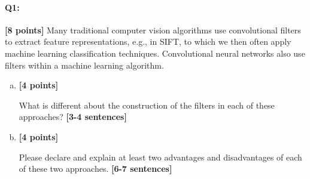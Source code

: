\pagebreak

\paragraph{Q1:} \textbf{[8 points]} Many traditional computer vision algorithms use convolutional filters to extract feature representations, e.g., in SIFT, to which we then often apply machine learning classification techniques. Convolutional neural networks also use filters within a machine learning algorithm.

\begin{enumerate} [(a)]
\item \textbf{[4 points]}

\begin{tcolorbox}[colback=orange!5!white,colframe=orange!75!black]
What is different about the construction of the filters in each of these approaches? \textbf{[3-4 sentences]}
\end{tcolorbox}

\item \textbf{[4 points]}

\begin{tcolorbox}[colback=orange!5!white,colframe=orange!75!black]
Please declare and explain at least two advantages and disadvantages of each of these two approaches. \textbf{[6-7 sentences]}
\end{tcolorbox}
\end{enumerate}

